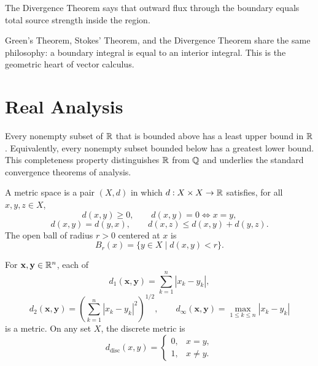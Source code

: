     \begin{idea}
        The Divergence Theorem says that outward flux through the boundary
        equals total source strength inside the region.
    \end{idea}

    \begin{remark}
        Green's Theorem, Stokes' Theorem, and the Divergence Theorem share the
        same philosophy: a boundary integral is equal to an interior integral.
        This is the geometric heart of vector calculus.
    \end{remark}

    \section*{Real Analysis}

    \begin{theorem}
        Every nonempty subset of $\mathbb{R}$ that is bounded above has a least upper
        bound in $\mathbb{R}$. Equivalently, every nonempty subset bounded below has a
        greatest lower bound. This completeness property distinguishes $\mathbb{R}$
        from $\mathbb{Q}$ and underlies the standard convergence theorems of analysis.
    \end{theorem}

    \begin{definition}
        A metric space is a pair $(X,d)$ in which $d:X\times X\to\mathbb{R}$ satisfies,
        for all $x,y,z\in X$,
        \[
            d(x,y)\geq 0,
            \qquad
            d(x,y)=0\Leftrightarrow x=y,
        \]
        \[
            d(x,y)=d(y,x),
            \qquad
            d(x,z)\leq d(x,y)+d(y,z).
        \]
        The open ball of radius $r>0$ centered at $x$ is
        \[
            B_r(x)=\{y\in X\mid d(x,y)<r\}.
        \]
    \end{definition}

    \begin{fact}
        For $\mathbf{x},\mathbf{y}\in\mathbb{R}^n$, each of
        \[
            d_1(\mathbf{x},\mathbf{y})
            =
            \sum_{k=1}^{n}|x_k-y_k|,
        \]
        \[
            d_2(\mathbf{x},\mathbf{y})
            =
            \left(
                \sum_{k=1}^{n}|x_k-y_k|^2
            \right)^{1/2},
            \qquad
            d_\infty(\mathbf{x},\mathbf{y})
            =
            \max_{1\leq k\leq n}|x_k-y_k|
        \]
        is a metric. On any set $X$, the discrete metric is
        \[
            d_{\mathrm{disc}}(x,y)
            =
            \begin{cases}
                0, & x=y,\\
                1, & x\neq y.
            \end{cases}
        \]
    \end{fact}

